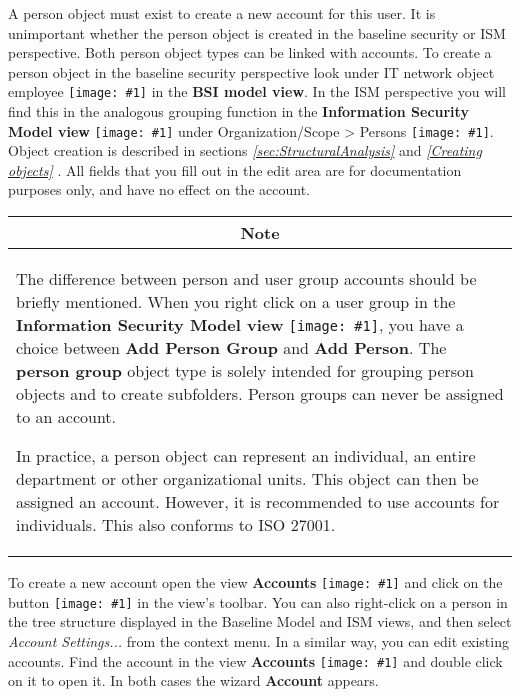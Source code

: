 \documentclass[a4paper,10pt]{book}
\newcommand{\icon}[1]{\texttt{[image: \#1]}}
\begin{document}
A person object must exist to create a new account for this user. It is unimportant whether the person object is created in the baseline security or ISM perspective. Both person object types can be linked with accounts.
To create a person object in the baseline security perspective look under IT network object employee  \icon{Icon/Mitarbeiter.png} in the \textbf{BSI model view}. In the ISM perspective you will find this in the analogous grouping function in the \textbf{Information Security Model view} \icon{Icon/Informationssicherheitsmodell.png} under Organization/Scope > Persons \icon{Icon/Mitarbeiter.png}.
Object creation is described in sections {\em \ref{sec:StructuralAnalysis} } and {\em \ref{Creating objects} }. All fields that you fill out in the edit area are for documentation purposes only, and have no effect on the account.

\begin{longtable}{| p{} |}
\hline
\multicolumn{1}{|c|}{\textbf{Note}} \\
\hline\hline
The difference between person and user group accounts should be briefly mentioned. When you right click on a user group in the \textbf{Information Security Model view} \icon{Icon/Informationssicherheitsmodell.png}, you have a choice between \textbf{Add Person Group} and \textbf{Add Person}. The \textbf{person group} object type is solely intended for grouping person objects and to create subfolders. Person groups can never be assigned to an account.

In practice, a person object can represent an individual, an entire department or other organizational units. This object can then be assigned an account. However, it is recommended to use accounts for individuals. This also conforms to ISO 27001. \\[10pt] \hline
\end{longtable}

To create a new account open the view \textbf{Accounts} \icon{Icon/Mitarbeiter.png} and click on the button \icon{Icon/user_add.png} in the view’s toolbar. You can also right-click on a person in the tree structure displayed in the Baseline Model and ISM views, and then select \textit{Account Settings...} from the context menu. In a similar way, you can edit existing accounts. Find the account in the view \textbf{Accounts} \icon{Icon/Mitarbeiter.png} and double click on it to open it. In both cases the wizard \textbf{Account} appears.
\end{document}
